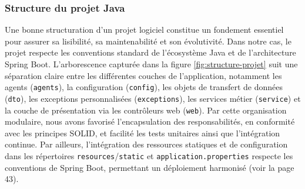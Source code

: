 \documentclass[12pt,a4paper]{report}
\begin{document}
	\subsubsection{Structure du projet Java}
	
	Une bonne structuration d’un projet logiciel constitue un fondement essentiel pour assurer sa lisibilité, sa maintenabilité et son évolutivité. Dans notre cas, le projet respecte les conventions standard de l’écosystème Java et de l’architecture Spring Boot. L’arborescence capturée dans la figure \ref{fig:structure-projet} suit une séparation claire entre les différentes couches de l’application, notamment les agents (\verb|agents|), la configuration (\verb|config|), les objets de transfert de données (\verb|dto|), les exceptions personnalisées (\verb|exceptions|), les services métier (\verb|service|) et la couche de présentation via les contrôleurs web (\verb|web|). Par cette organisation modulaire, nous avons favorisé l'encapsulation des responsabilités, en conformité avec les principes SOLID, et facilité les tests unitaires ainsi que l’intégration continue. Par ailleurs, l’intégration des ressources statiques et de configuration dans les répertoires \verb|resources|/\verb|static| et \verb|application.properties| respecte les conventions de Spring Boot, permettant un déploiement harmonisé (voir la page 43).
	
\end{document}
